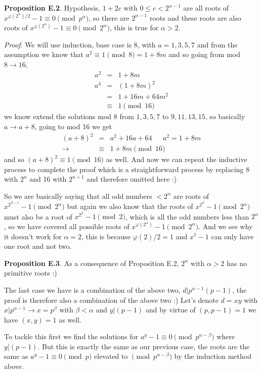 \documentclass[aps,preprint,preprintnumbers,nofootinbib,showpacs,prd]{revtex4-1}
\newcommand{\nbea}{\begin{eqnarray*}}
\newcommand{\neea}{\end{eqnarray*}}
\begin{document}
{\bf Proposition E.2}. Hypothesis, $1 + 2c$ with $0 \le c < 2^{\alpha-1}$ are all roots of $x^{\varphi(2^\alpha)/2} - 1 \equiv 0 \pmod{p^\alpha}$, so there are $2^{\alpha-1}$ roots and these roots are also roots of $x^{\varphi(2^\alpha)} - 1 \equiv 0 \pmod{2^\alpha}$, this is true for $\alpha > 2$.

{\it Proof}. We will use induction, base case is 8, with $a = 1, 3, 5, 7$ and from the assumption we know that $a^2 \equiv 1 \pmod{8} = 1 + 8m$ and so going from mod $8\to16$,
%
\nbea
a^2 & = & 1+8m \\
a^4 & = & (1 + 8m)^2 \\
& = & 1 + 16m + 64m^2 \\
& \equiv & 1 \pmod{16}
\neea
%
we know extend the solutions mod 8 from $1, 3, 5, 7$ to $9, 11, 13, 15$, so basically $a \to a + 8$, going to mod 16 we get
%
\nbea
(a + 8)^2 & = & a^2 + 16a + 64 ~~~~~~~ a^2 = 1+ 8m \\
\to & \equiv & 1 + 8m \pmod{16}
\neea
%
and so $(a + 8)^2 \equiv 1 \pmod{16}$ as well. And now we can repeat the inductive process to complete the proof which is a straightforward process by replacing 8 with $2^n$ and 16 with $2^{n+1}$ and therefore omitted here :)

So we are basically saying that all odd numbers $< 2^\alpha$ are roots of $x^{2^{\beta-1}} - 1 \pmod{2^\alpha}$ but again we also know that the roots of $x^{2^\beta} - 1 \pmod{2^\alpha}$ must also be a root of $x^{2^\beta} - 1 \pmod{2}$, which is all the odd numbers less than $2^\alpha$, so we have covered all possible roots of $x^{\varphi(2^\alpha)} - 1 \pmod{2^\alpha}$. And we see why it doesn't work for $\alpha = 2$, this is because $\varphi(2)/2 = 1$ and $x^1 - 1$ can only have one root and not two.

{\bf Proposition E.3}. As a consequence of Proposition E.2, $2^\alpha$ with $\alpha > 2$ has no primitive roots :)

The last case we have is a combination of the above two, $d|p^{\alpha-1}(p-1)$, the proof is therefore also a combination of the above two :) Let's denote $d = xy$ with $x|p^{\alpha-1} \to x = p^\beta$ with $\beta < \alpha$ and $y|(p-1)$ and by virtue of $(p,p-1) = 1$ we have $(x,y) = 1$ as well.

To tackle this first we find the solutions for $a^y - 1 \equiv 0 \pmod{p^{\alpha-\beta}}$ where $y|(p-1)$. But this is exactly the same as our previous case, the roots are the same as $a^y-1 \equiv 0 \pmod{p}$ elevated to $\pmod{p^{\alpha-\beta}}$ by the induction method above.
\end{document}
